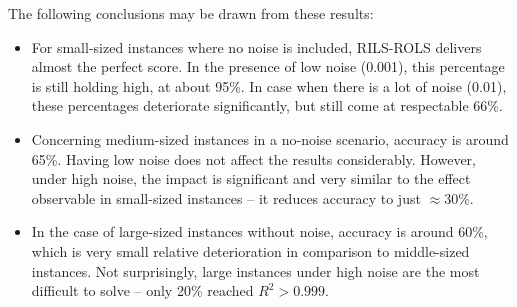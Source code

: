 \documentclass{bmcart}
\begin{document}
\begin{center}
	\label{fig:compR2_noise_size}
\end{center}

The following conclusions may be drawn from these results:

\begin{itemize}
	
	\item For small-sized instances where no noise is included, \textsc{RILS}-\textsc{ROLS} delivers almost the perfect score. In the presence of low noise (0.001), this percentage is still holding high, at about 95\%. In case when there is a lot of noise (0.01), these percentages deteriorate significantly, but still come at respectable 66\%. 
	
	\item Concerning medium-sized instances in a no-noise scenario, accuracy is around 65\%. Having low noise does not affect the results considerably. However, under high noise, the impact is significant and very similar to the effect observable in small-sized instances -- it reduces accuracy to just $\approx$30\%.
	
	\item In the case of large-sized instances without noise,  accuracy is around 60\%, which is very small relative deterioration in comparison to middle-sized instances. Not surprisingly, large instances under high noise are the most difficult to solve -- only 20\% reached $R^2 > 0.999$. 
	
\end{itemize}
\end{document}
